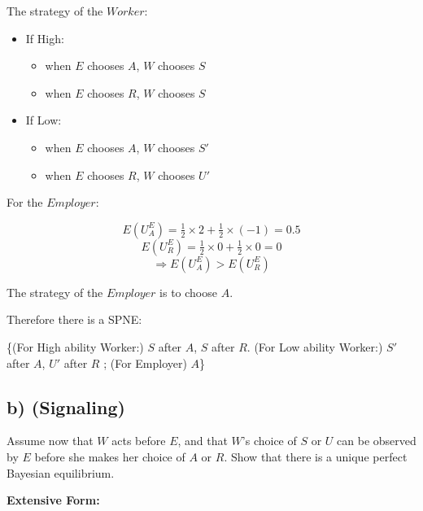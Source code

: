\documentclass{article}
\begin{document}
\medskip

The strategy of the $Worker$:
\begin{itemize}
\item If High:
\begin{itemize}
\item when $E$ chooses $A$, $W$ chooses $S$
\item when $E$ chooses $R$, $W$ chooses $S$
\end{itemize}
\item If Low:
\begin{itemize}
\item when $E$ chooses $A$, $W$ chooses $S'$
\item when $E$ chooses $R$, $W$ chooses $U'$
\end{itemize}
\end{itemize}

For the $Employer$:

$$E(U^E_A) = \tfrac12 \times 2 +\tfrac12 \times (-1) = 0.5$$
$$E(U^E_R) = \tfrac12 \times 0 +\tfrac12 \times 0 = 0$$
$$\Rightarrow E(U^E_A) > E(U^E_R)$$

The strategy of the $Employer$ is to choose $A$.

\medskip

Therefore there is a SPNE:

\{(For High ability Worker:) $S$ after $A$, $S$ after $R$. (For Low ability Worker:) $S'$ after $A$, $U'$ after $R$ ; (For Employer) $A$\}


\subsection*{b) (Signaling)} Assume now that $W$ acts before $E$, and that $W$'s choice of $S$ or $U$ can be
observed by $E$ before she makes her choice of $A$ or $R$. Show that there is a unique
perfect Bayesian equilibrium.

\medskip

\textbf{Extensive Form:}

\medskip
\end{document}
